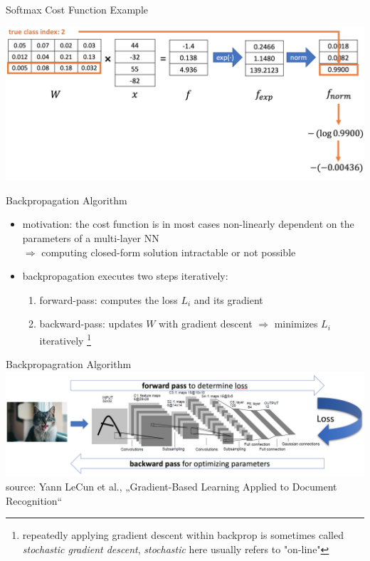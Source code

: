 \documentclass{beamer}
\begin{document}
\begin{frame}{Softmax Cost Function Example}
\begin{center}
\includegraphics[width=1.05\textwidth]{softmax_example6}
\end{center}
\end{frame}

\begin{frame}{Backpropagation Algorithm}

\begin{itemize}
\item motivation: the cost function is in most cases non-linearly dependent on the parameters of a multi-layer NN\\
$\Rightarrow$ computing closed-form solution intractable or not possible
\item backpropagation executes two steps iteratively:
\begin{enumerate}
\item forward-pass: computes the loss $L_i$ and its gradient 
\item backward-pass: updates $W$ with gradient descent $\Rightarrow$ minimizes $L_i$ iteratively \footnote{repeatedly applying gradient descent within backprop is sometimes called \emph{stochastic gradient descent}, \emph{stochastic} here usually refers to "on-line"}
\end{enumerate} 
\end{itemize}
\end{frame}

\begin{frame}{Backpropagration Algorithm}
\includegraphics[width=1.1\textwidth]{backprop}\\

source: Yann LeCun et al., „Gradient-Based Learning Applied to Document Recognition“
\end{frame}
\end{document}
